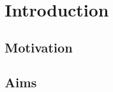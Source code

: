 \documentclass[main.tex]{subfiles}
\begin{document}
  \section{Introduction}
    \subsection{Motivation}
      \lipsum[2]
    \subsection{Aims}
      \lipsum[3]
\end{document}
